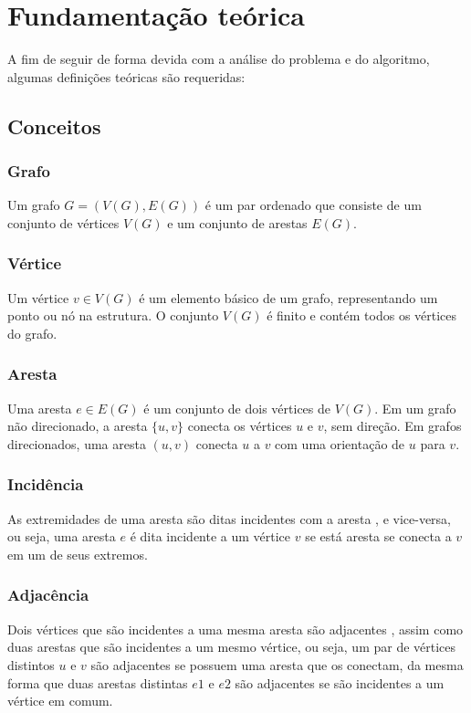 \chapter{Fundamentação teórica}
A fim de seguir de forma devida com a análise do problema e do algoritmo, algumas definições teóricas são requeridas:

\section{Conceitos}

\subsection{Grafo}
Um grafo $G = (V(G), E(G))$ é um par ordenado que consiste de um conjunto de vértices $V(G)$ e um conjunto de arestas $E(G)$.

\subsection{Vértice}
Um vértice $v \in V(G)$ é um elemento básico de um grafo, representando um ponto ou nó na estrutura. O conjunto $V(G)$ é finito e contém todos os vértices do grafo.

\subsection{Aresta}
Uma aresta $e \in E(G)$ é um conjunto de dois vértices de $V(G)$. Em um grafo não direcionado, a aresta $\{u, v\}$ conecta os vértices $u$ e $v$, sem direção. Em grafos direcionados, uma aresta $(u, v)$ conecta $u$ a $v$ com uma orientação de $u$ para $v$.

\subsection{Incidência}
As extremidades de uma aresta são ditas incidentes com a aresta \cite{Bondy2008}, e vice-versa, ou seja, uma aresta $e$ é dita incidente a um vértice $v$ se está aresta se conecta a $v$ em um de seus extremos.

\subsection{Adjacência}
Dois vértices que são incidentes a uma mesma aresta são adjacentes \cite{Bondy2008}, assim como duas arestas que são incidentes a um mesmo vértice, ou seja, um par de vértices distintos $u$ e $v$ são adjacentes se possuem uma aresta que os conectam, da mesma forma que duas arestas distintas $e1$ e $e2$ são adjacentes se são incidentes a um vértice em comum.

